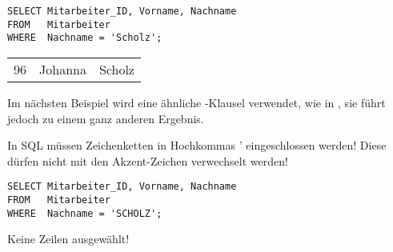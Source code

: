           \begin{lstlisting}[language=oracle_sql,caption={Ein einfacher Zeichenkettenvergleich},label=sql02_06]
SELECT Mitarbeiter_ID, Vorname, Nachname
FROM   Mitarbeiter
WHERE  Nachname = 'Scholz';
          \end{lstlisting}
          \begin{center}
            \begin{small}
              \tablehead{}
              \tabletail{
              }
              \begin{msoraclesql}
                \begin{supertabular}{rll}
                  96 & Johanna & Scholz \\
                \end{supertabular}
              \end{msoraclesql}
            \end{small}
          \end{center}
          Im n\"achsten Beispiel wird eine \"ahnliche -Klausel verwendet, wie in , sie f\"uhrt jedoch zu einem ganz anderen Ergebnis.
          \begin{merke}
            In SQL m\"ussen Zeichenketten in Hochkommas ' eingeschlossen werden! Diese d\"urfen nicht mit den Akzent-Zeichen verwechselt werden!
          \end{merke}
          \begin{lstlisting}[language=oracle_sql,caption={Ein einfacher Zeichenkettenvergleich},label=sql02_07]
SELECT Mitarbeiter_ID, Vorname, Nachname
FROM   Mitarbeiter
WHERE  Nachname = 'SCHOLZ';
          \end{lstlisting}
          \begin{center}
            \begin{small}
              \begin{oraclesql}
Keine Zeilen ausgew\"ahlt!
              \end{oraclesql}
            \end{small}
          \end{center}
